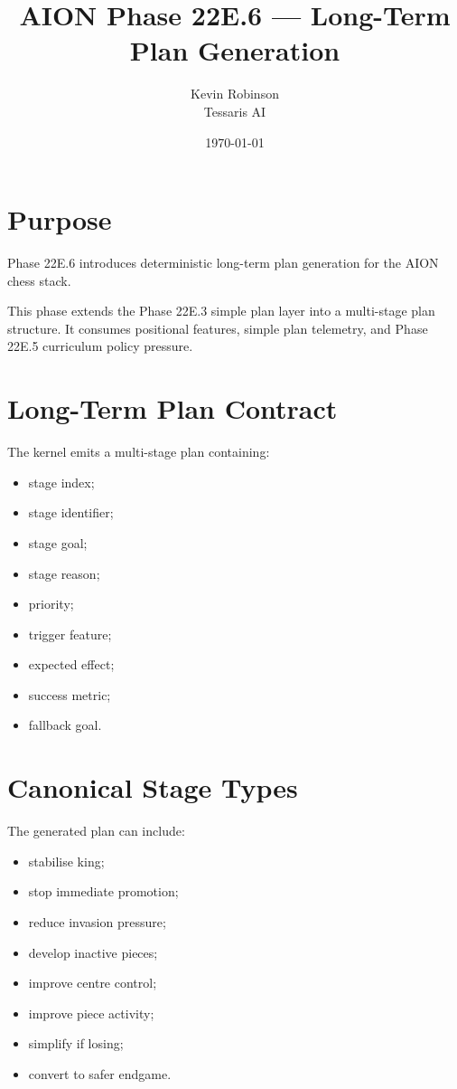 \documentclass[11pt,a4paper]{article}
\title{\textbf{AION Phase 22E.6 --- Long-Term Plan Generation}}
\author{Kevin Robinson\\Tessaris AI}
\date{\today}
\begin{document}
\maketitle

\section{Purpose}

Phase 22E.6 introduces deterministic long-term plan generation for the AION chess stack.

This phase extends the Phase 22E.3 simple plan layer into a multi-stage plan structure. It consumes positional features, simple plan telemetry, and Phase 22E.5 curriculum policy pressure.

\section{Long-Term Plan Contract}

The kernel emits a multi-stage plan containing:

\begin{itemize}[leftmargin=*]
  \item stage index;
  \item stage identifier;
  \item stage goal;
  \item stage reason;
  \item priority;
  \item trigger feature;
  \item expected effect;
  \item success metric;
  \item fallback goal.
\end{itemize}

\section{Canonical Stage Types}

The generated plan can include:

\begin{itemize}[leftmargin=*]
  \item stabilise king;
  \item stop immediate promotion;
  \item reduce invasion pressure;
  \item develop inactive pieces;
  \item improve centre control;
  \item improve piece activity;
  \item simplify if losing;
  \item convert to safer endgame.
\end{itemize}
\end{document}
